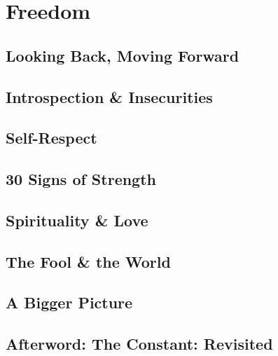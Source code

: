 \documentclass{article}
\numberwithin{equation}{section}
\begin{document}

\section{Freedom}

\subsection{Looking Back, Moving Forward}

\subsection{Introspection \& Insecurities}

\subsection{Self-Respect}

\subsection{30 Signs of Strength}

\subsection{Spirituality \& Love}

\subsection{The Fool \& the World}

\subsection{A Bigger Picture}

\subsection{Afterword: The Constant: Revisited}


\printbibliography[heading=bibintoc]
	
\end{document}
